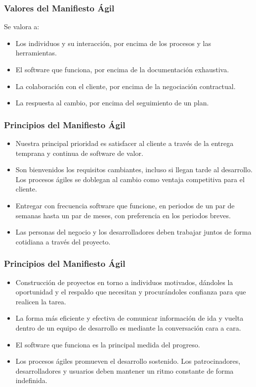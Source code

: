 \documentclass[12pt]{beamer}
\begin{document}
\begin{frame}
 \frametitle{Valores del Manifiesto Ágil}
 Se valora a: 
 \begin{itemize}
  \item<2-> Los individuos y su interacción, por encima de los procesos y las herramientas.
  \item<3-> El software que funciona, por encima de la documentación exhaustiva.
  \item<4-> La colaboración con el cliente, por encima de la negociación contractual.
  \item<5-> La respuesta al cambio, por encima del seguimiento de un plan.
 \end{itemize}
\end{frame}



\begin{frame}
 \frametitle{Principios del Manifiesto Ágil}
 \begin{itemize}
  \item<2-> Nuestra principal prioridad es satisfacer al cliente a través de la entrega temprana y continua de software de valor.
  \item<3-> Son bienvenidos los requisitos cambiantes, incluso si llegan tarde al desarrollo. Los procesos ágiles se doblegan al cambio como ventaja competitiva para el cliente.
  \item<4-> Entregar con frecuencia software que funcione, en periodos de un par de semanas hasta un par de meses, con preferencia en los periodos breves.
  \item<5-> Las personas del negocio y los desarrolladores deben trabajar juntos de forma cotidiana a través del proyecto.
\end{itemize}
\end{frame}  
  
\begin{frame}
 \frametitle{Principios del Manifiesto Ágil}
 \begin{itemize}
  \item<2-> Construcción de proyectos en torno a individuos motivados, dándoles la oportunidad y el respaldo que necesitan y procurándoles confianza para que realicen la tarea.
  \item<3-> La forma más eficiente y efectiva de comunicar información de ida y vuelta dentro de un equipo de desarrollo es mediante la conversación cara a cara.
  \item<4-> El software que funciona es la principal medida del progreso.
  \item<5-> Los procesos ágiles promueven el desarrollo sostenido. Los patrocinadores, desarrolladores y usuarios deben mantener un ritmo constante de forma indefinida.
  
 \end{itemize}
\end{frame}
\end{document}
